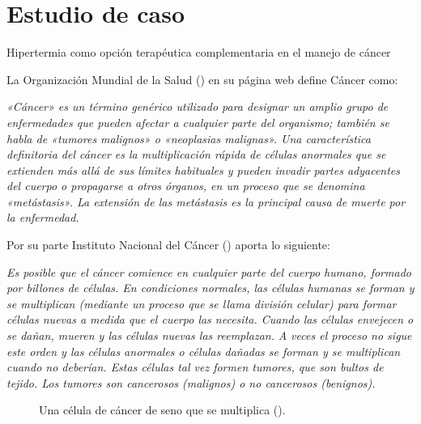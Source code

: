 \documentclass[
  spanish,
  us-letterpaper,
  DIV=11,
  numbers=noendperiod]{scrreprt}
\begin{document}
\part{Estudio de caso}

Hipertermia como opción terapéutica complementaria en el manejo de
cáncer

\hfill\break

La Organización Mundial de la Salud () en
su página web define Cáncer como:

\emph{«Cáncer» es un término genérico utilizado para designar un amplio
grupo de enfermedades que pueden afectar a cualquier parte del
organismo; también se habla de «tumores malignos» o «neoplasias
malignas». Una característica definitoria del cáncer es la
multiplicación rápida de células anormales que se extienden más allá de
sus límites habituales y pueden invadir partes adyacentes del cuerpo o
propagarse a otros órganos, en un proceso que se denomina «metástasis».
La extensión de las metástasis es la principal causa de muerte por la
enfermedad.}

Por su parte Instituto Nacional del Cáncer
() aporta lo siguiente:

\emph{Es posible que el cáncer comience en cualquier parte del cuerpo
humano, formado por billones de células. En condiciones normales, las
células humanas se forman y se multiplican (mediante un proceso que se
llama división celular) para formar células nuevas a medida que el
cuerpo las necesita. Cuando las células envejecen o se dañan, mueren y
las células nuevas las reemplazan.} \emph{A veces el proceso no sigue
este orden y las células anormales o células dañadas se forman y se
multiplican cuando no deberían. Estas células tal vez formen tumores,
que son bultos de tejido. Los tumores son cancerosos (malignos) o no
cancerosos (benignos).}

\begin{figure}


\caption{\label{fig-breast-cancer}Una célula de cáncer de seno que se
multiplica ().}

\end{figure}%
\end{document}
